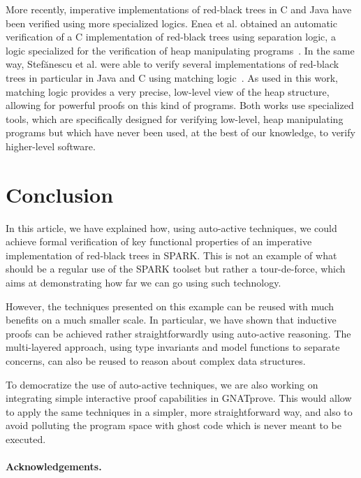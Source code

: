 \documentclass{llncs}
\begin{document}
More recently, imperative implementations of red-black trees in C and Java have been verified using more specialized logics.
Enea et al. obtained an automatic verification of a C implementation of red-black trees using separation logic, a logic
specialized for the verification of heap manipulating programs~\cite{enea2015automated}. In the
same way, Stef{\u{a}}nescu et al. were able to verify several implementations of red-black trees in particular in Java and
C using matching logic~\cite{stefuanescu2016semantics}. As used in this work, matching logic provides a very precise,
low-level view of the heap structure, allowing for powerful proofs on this kind of programs. Both works use specialized tools,
which are specifically designed for verifying low-level, heap manipulating programs but which have never been used, at the best
of our knowledge, to verify higher-level software.

\section{Conclusion}
In this article, we have explained how, using auto-active techniques, we could achieve formal verification of key functional
properties of an imperative implementation of red-black trees in SPARK. This is not an example of what should be a regular
use of the SPARK toolset but rather a tour-de-force, which aims at demonstrating how far we can go using such technology.

However, the techniques presented on this example can be reused with much benefits on a much smaller scale. In particular, we have shown that
inductive proofs can be achieved rather straightforwardly using auto-active reasoning. The multi-layered approach, using
type invariants and model functions to separate concerns, can also be reused to reason about complex data structures.

To democratize the use of auto-active techniques, we are also working on integrating simple interactive proof capabilities
in GNATprove. This would allow to apply the same techniques in a simpler, more straightforward way, and also to avoid
polluting the program space with ghost code which is never meant to be executed.

\paragraph*{Acknowledgements.}




\end{document}
